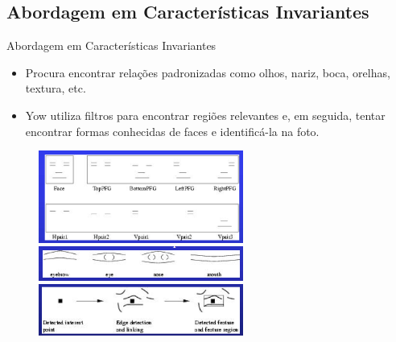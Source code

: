 \documentclass[aspectratio=169, xcolor=dvipsnames]{beamer}
\let\olditem=\item%
\renewcommand{\item}{\olditem \justifying}
\begin{document}
\subsection{Abordagem em Características Invariantes}
\begin{frame}{Abordagem em Características Invariantes}
	\begin{itemize}
		\setlength{\itemsep}{1.5em}
		\item Procura encontrar relações padronizadas como olhos, nariz, boca, orelhas, textura, etc. 
		
		\item Yow \cite{yow1996probabilistic} \cite{yow1997feature} utiliza filtros para encontrar regiões relevantes e, em seguida, tentar encontrar formas conhecidas de faces e identificá-la na foto.
		
	\end{itemize}
\end{frame}

\begin{frame}
	\begin{figure}
		\centering
		\label{fig:inst}
		\includegraphics[width=0.6\textwidth]{img/m4-1.png}\\\pause
		\includegraphics[width=0.6\textwidth]{img/m4-2.png}\\\pause
		\includegraphics[width=0.6\textwidth]{img/m4-3.png}
	\end{figure}
\end{frame}
\end{document}
